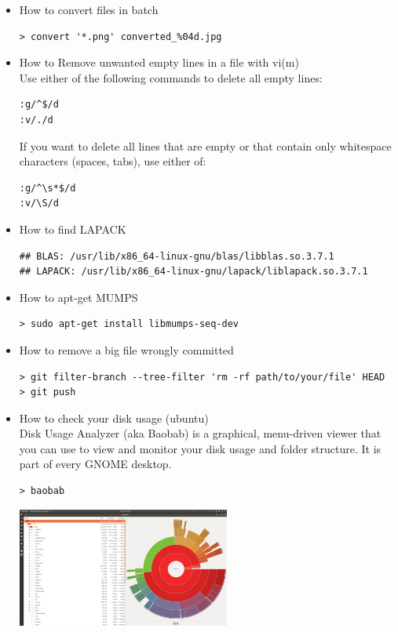 
\begin{itemize}
\item How to convert files in batch 

\begin{verbatim}
> convert '*.png' converted_%04d.jpg
\end{verbatim}

\item How to Remove unwanted empty lines in a file with vi(m)\\
Use either of the following commands to delete all empty lines: 
\begin{verbatim}
:g/^$/d
:v/./d
\end{verbatim}
If you want to delete all lines that are empty or that contain only whitespace 
characters (spaces, tabs), use either of: 
\begin{verbatim}
:g/^\s*$/d
:v/\S/d
\end{verbatim}

\item How to find LAPACK
\begin{verbatim}
## BLAS: /usr/lib/x86_64-linux-gnu/blas/libblas.so.3.7.1
## LAPACK: /usr/lib/x86_64-linux-gnu/lapack/liblapack.so.3.7.1
\end{verbatim}

\item How to apt-get MUMPS

\begin{verbatim}
> sudo apt-get install libmumps-seq-dev
\end{verbatim}

\item How to remove a big file wrongly committed

\begin{verbatim}
> git filter-branch --tree-filter 'rm -rf path/to/your/file' HEAD
> git push
\end{verbatim}

\item How to check your disk usage (ubuntu)\\

Disk Usage Analyzer (aka Baobab) is a graphical, menu-driven viewer 
that you can use to view and monitor your disk usage and folder structure. 
It is part of every GNOME desktop.

\begin{verbatim}
> baobab
\end{verbatim}

\begin{center}
\includegraphics[width=7cm]{images/baobab}
\end{center}



\end{itemize}

